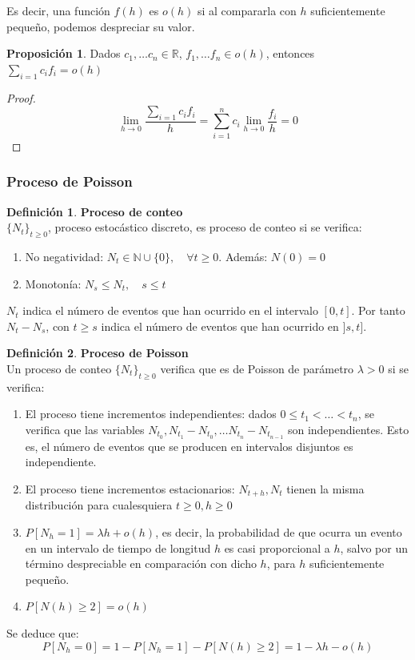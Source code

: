 \documentclass[a4paper,10pt]{scrartcl}
\theoremstyle{definition}
\newtheorem*{mydef}{Definición}
\newtheorem*{fact}{Proposición}
\numberwithin{equation}{section}
\begin{document}
  Es decir, una función $f(h)$ es $o(h)$ si al compararla con $h$ suficientemente pequeño, podemos despreciar su
  valor.

  \begin{fact}
  Dados $c_1, \ldots c_n \in \mathbb{R}$, $f_1, \ldots f_n \in o(h)$, entonces $\sum_{i=1} c_i f_i = o(h)$
  \end{fact}

  \begin{proof}
  \[\lim_{h\rightarrow 0} \frac{\sum_{i=1} c_i f_i}{h} = \sum_{i=1}^n{c_i \lim_{h\rightarrow 0} \frac{f_i}{h}} = 0\]
  \end{proof}

\subsubsection{Proceso de Poisson}

  \begin{mydef} \textbf{Proceso de conteo}\\
  $\{N_t\}_{t\ge 0}$, proceso estocástico discreto, es proceso de conteo si se verifica:
  \begin{enumerate}
    \item No negatividad: $N_t \in \mathbb{N}\cup\{0\}, \quad \forall t\ge 0$. Además: $N(0)=0$
    \item Monotonía: $N_s \le N_t, \quad s \le t$
  \end{enumerate}

  $N_t$ indica el número de eventos que han ocurrido en el intervalo $[0,t]$. Por tanto $N_t- N_s$, con $t\ge s$
  indica el número de eventos que han ocurrido en $]s,t]$.
  \end{mydef}


  \begin{mydef} \textbf{Proceso de Poisson}\\
  Un proceso de conteo $\{N_t\}_{t\ge 0}$ verifica que es de Poisson de parámetro $\lambda > 0$ si se verifica:
  
  \begin{enumerate}
    \item El proceso tiene incrementos independientes: dados $0 \le t_1 < \ldots < t_n$, se verifica que
    las variables $N_{t_0}, N_{t_1} - N_{t_0}, \ldots N_{t_n}- N_{t_{n-1}}$ son independientes. Esto es, el número de eventos
    que se producen en intervalos disjuntos es independiente.
    \item El proceso tiene incrementos estacionarios: $N_{t+h}, N_t$ tienen la misma distribución para cualesquiera
    $t\ge 0, h\ge 0$
    \item $P[N_h = 1] = \lambda h + o(h)$, es decir, la probabilidad de que ocurra un evento en un intervalo de
    tiempo de longitud $h$ es casi proporcional a $h$, salvo por un término despreciable en comparación con dicho $h$, para
    $h$ suficientemente pequeño.
    \item $P[N(h) \ge 2] = o(h)$
  \end{enumerate}

  Se deduce que: 
  \[P[N_h = 0] = 1 - P[N_h=1] - P[N(h) \ge 2] = 1 -\lambda h - o(h)\]
  \end{mydef}
\end{document}
